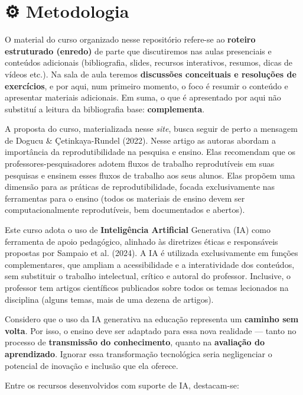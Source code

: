 \documentclass[
  a4paper,
]{book}
\begin{document}
\section*{⚙️ Metodologia}\label{sec-method}


O material do curso organizado nesse repositório refere-se ao
\textbf{roteiro estruturado (enredo)} de parte que discutiremos nas
aulas presenciais e conteúdos adicionais (bibliografia, slides, recursos
interativos, resumos, dicas de vídeos etc.). Na sala de aula teremos
\textbf{discussões conceituais e resoluções de exercícios}, e por aqui,
num primeiro momento, o foco é resumir o conteúdo e apresentar materiais
adicionais. Em suma, o que é apresentado por aqui não substituí a
leitura da bibliografia base: \textbf{complementa}.

A proposta do curso, materializada nesse \emph{site}, busca seguir de
perto a mensagem de Dogucu \& Çetinkaya-Rundel (2022). Nesse artigo as
autoras abordam a importância da reprodutibilidade na pesquisa e ensino.
Elas recomendam que os professores-pesquisadores adotem fluxos de
trabalho reprodutíveis em suas pesquisas e ensinem esses fluxos de
trabalho aos seus alunos. Elas propõem uma dimensão para as práticas de
reprodutibilidade, focada exclusivamente nas ferramentas para o ensino
(todos os materiais de ensino devem ser computacionalmente
reprodutíveis, bem documentados e abertos).

Este curso adota o uso de \textbf{Inteligência Artificial} Generativa
(IA) como ferramenta de apoio pedagógico, alinhado às diretrizes éticas
e responsáveis propostas por Sampaio et al. (2024). A IA é utilizada
exclusivamente em funções complementares, que ampliam a acessibilidade e
a interatividade dos conteúdos, sem substituir o trabalho intelectual,
crítico e autoral do professor. Inclusive, o professor tem artigos
científicos publicados sobre todos os temas lecionados na disciplina
(alguns temas, mais de uma dezena de artigos).

Considero que o uso da IA generativa na educação representa um
\textbf{caminho sem volta}. Por isso, o ensino deve ser adaptado para
essa nova realidade --- tanto no processo de \textbf{transmissão do
conhecimento}, quanto na \textbf{avaliação do aprendizado}. Ignorar essa
transformação tecnológica seria negligenciar o potencial de inovação e
inclusão que ela oferece.

Entre os recursos desenvolvidos com suporte de IA, destacam-se:
\end{document}
